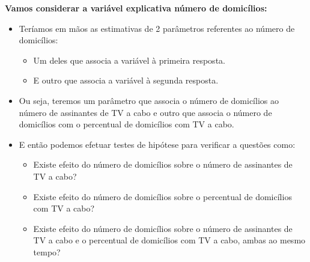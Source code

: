 \documentclass[10pt,
  aspectratio=169,
  serif,
  mathserif,
  professionalfont,
  compress,
  handout,
  ]{beamer}\usepackage[]{graphicx}\usepackage[]{color}
\begin{document}
\begin{frame}[c, allowframebreaks]

\textbf{Vamos considerar a variável explicativa número de domicílios:}

\begin{itemize}

  \item Teríamos em mãos as estimativas de 2 parâmetros referentes ao número de domicílios:
  
  \begin{itemize}
  
    \item Um deles que associa a variável à primeira resposta.
  
    \item E outro que associa a variável à segunda resposta.
  
  \end{itemize}
  
  \item Ou seja, teremos um parâmetro que associa o número de domicílios ao número de assinantes de TV a cabo e outro que associa o número de domicílios com o percentual de domicílios com TV a cabo.
  
\end{itemize}

\end{frame}

\begin{frame}[c, allowframebreaks]
  
\begin{itemize}

  \item E então podemos efetuar testes de hipótese para verificar a questões como:
  
  \begin{itemize}
    
    \item Existe efeito do número de domicílios sobre o número de assinantes de TV a cabo? 
    
    \item Existe efeito do número de domicílios sobre o percentual de domicílios com TV a cabo?
    
    \item Existe efeito do número de domicílios sobre o número de assinantes de TV a cabo e o percentual de domicílios com TV a cabo, ambas ao mesmo tempo?
    
  \end{itemize}

\end{itemize}

\end{frame}
\end{document}
